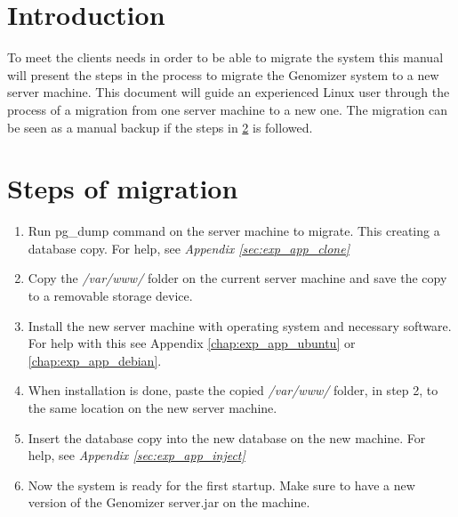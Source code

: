 \label{chap:exp_app_migration}
\section{Introduction}
To meet the clients needs in order to be able to migrate the system this manual will present the steps in the process to migrate the Genomizer system to a new server machine. This document will guide an experienced Linux user through the process of a migration from one server machine to a new one. The migration can be seen as a manual backup if the steps in \ref{sec:exp_steps} is followed. 

\section{Steps of migration}\label{sec:exp_steps}
\begin{enumerate}
	\item Run pg\_dump command on the server machine to migrate. This creating a database copy. For help, see \emph{Appendix \ref{sec:exp_app_clone}}
	\item Copy the \emph{/var/www/} folder on the current server machine and save the copy to a removable storage device.
	\item Install the new server machine with operating system and necessary software. For help with this see Appendix \ref{chap:exp_app_ubuntu} or \ref{chap:exp_app_debian}.
	\item When installation is done, paste the copied \emph{/var/www/} folder, in step 2, to the same location on the new server machine. 
	\item Insert the database copy into the new database on the new machine. For help, see \emph{Appendix \ref{sec:exp_app_inject}}
	\item Now the system is ready for the first startup. Make sure to have a new version of the Genomizer server.jar on the machine.
\end{enumerate}


